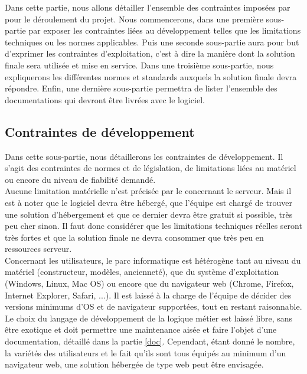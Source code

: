 Dans cette partie, nous allons détailler l'ensemble des contraintes imposées par \nomClient{} pour le déroulement du projet. Nous commencerons, dans une première sous-partie par exposer les contraintes liées au développement telles que les limitations techniques ou les normes applicables. Puis une seconde sous-partie aura pour but d'exprimer les contraintes d'exploitation, c'est à dire la manière dont la solution finale sera utilisée et mise en service. Dans une troisième sous-partie, nous expliquerons les différentes normes et standards auxquels la solution finale devra répondre. Enfin, une dernière sous-partie permettra de lister l'ensemble des documentations qui devront être livrées avec le logiciel.


\subsection{Contraintes de développement}
Dans cette sous-partie, nous détaillerons les contraintes de développement. Il s'agit des contraintes de normes et de législation, de limitations liées au matériel ou encore du niveau de fiabilité demandé.\\


Aucune limitation matérielle n'est précisée par le \client{} concernant le serveur. Mais il est à noter que le logiciel devra être hébergé, que l'équipe \PICCourt{} est chargé de trouver une solution d'hébergement et que ce dernier devra être gratuit si possible, très peu cher sinon. Il faut donc considérer que les limitations techniques réelles seront très fortes et que la solution finale ne devra consommer que très peu en ressources serveur.\\

Concernant les utilisateurs, le parc informatique est hétérogène tant au niveau du matériel (constructeur, modèles, ancienneté), que du système d'exploitation (Windows, Linux, Mac OS) ou encore que du navigateur web (Chrome, Firefox, Internet Explorer, Safari, ...). Il est laissé à la charge de l'équipe \PICCourt{} de décider des versions minimums d'OS et de navigateur supportées, tout en restant raisonnable.\\


Le choix du langage de développement de la logique métier est laissé libre, sans être exotique et doit permettre une maintenance aisée et faire l'objet d'une documentation, détaillé dans la partie \ref{doc}. Cependant, étant donné le nombre, la variétés des utilisateurs et le fait qu'ils sont tous équipés au minimum d'un navigateur web, une solution hébergée de type web peut être envisagée.\\

